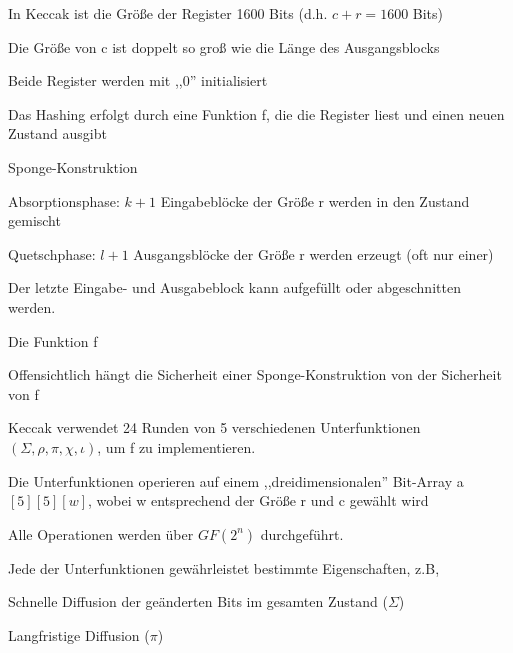 \documentclass[a4paper]{article}
\begin{document}
\begin{multicols}{3}
\begin{itemize*}
\begin{itemize*}
                  \item In Keccak ist die Größe der Register 1600 Bits (d.h. $c+r=1600$ Bits)
                  \item Die Größe von c ist doppelt so groß wie die Länge des Ausgangsblocks
                  \item Beide Register werden mit ,,0'' initialisiert
            \end{itemize*}
            \item Das Hashing erfolgt durch eine Funktion f, die die Register liest und
            einen neuen Zustand ausgibt
            \item Sponge-Konstruktion
            \begin{itemize*}
                  \item Absorptionsphase: $k + 1$ Eingabeblöcke der Größe r werden in den Zustand gemischt
                  \item Quetschphase: $l + 1$ Ausgangsblöcke der Größe r werden erzeugt (oft nur einer)
                  \item Der letzte Eingabe- und Ausgabeblock kann aufgefüllt oder abgeschnitten werden.
            \end{itemize*}
            \item Die Funktion f
            \begin{itemize*}
                  \item Offensichtlich hängt die Sicherheit einer Sponge-Konstruktion von der Sicherheit von f
                  \item Keccak verwendet 24 Runden von 5 verschiedenen Unterfunktionen $(\Sigma, \rho, \pi,\chi,\iota)$, um f zu implementieren.
                  \item Die Unterfunktionen operieren auf einem ,,dreidimensionalen'' Bit-Array a $[5][5][w]$, wobei w entsprechend der Größe r und c gewählt wird
                  \item Alle Operationen werden über $GF(2^n)$ durchgeführt.
                  \item Jede der Unterfunktionen gewährleistet bestimmte Eigenschaften, z.B,
                  \begin{itemize*}
                        \item Schnelle Diffusion der geänderten Bits im gesamten Zustand ($\Sigma$)
                        \item Langfristige Diffusion ($\pi$)

\end{itemize*}
\end{itemize*}
\end{itemize*}
\end{multicols}
\end{document}
